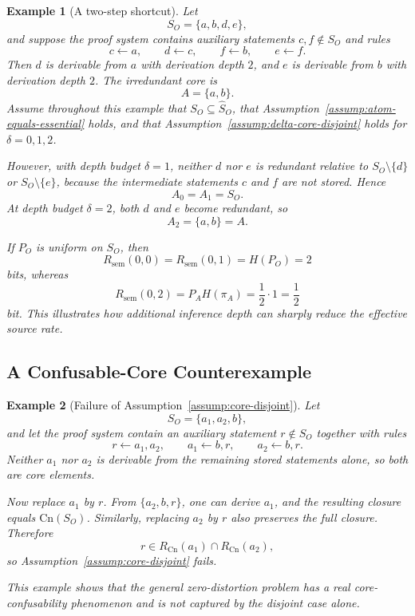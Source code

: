 \documentclass[journal,onecolumn]{IEEEtran}
\newcommand{\Cn}{\text{Cn}}
\newtheorem{example}{Example}[section]
\numberwithin{equation}{section}
\begin{document}
\begin{example}[A two-step shortcut]
\label{ex:rate-depth}
Let
\[
  S_O=\{a,b,d,e\},
\]
and suppose the proof system contains auxiliary statements
\(c,f\notin S_O\) and rules
\[
  c\leftarrow a,
  \qquad
  d\leftarrow c,
  \qquad
  f\leftarrow b,
  \qquad
  e\leftarrow f.
\]
Then \(d\) is derivable from \(a\) with derivation depth \(2\), and \(e\)
is derivable from \(b\) with derivation depth \(2\).
The irredundant core is
\[
  A=\{a,b\}.
\]
Assume throughout this example that \(S_O\subseteq\hat S_O\), that
Assumption~\ref{assump:atom-equals-essential} holds, and that
Assumption~\ref{assump:delta-core-disjoint} holds for
\(\delta=0,1,2\).

However, with depth budget \(\delta=1\), neither \(d\) nor \(e\)
is redundant relative to \(S_O\setminus\{d\}\) or \(S_O\setminus\{e\}\),
because the intermediate statements \(c\) and \(f\) are not stored.
Hence
\[
  A_0=A_1=S_O.
\]
At depth budget \(\delta=2\), both \(d\) and \(e\) become redundant,
so
\[
  A_2=\{a,b\}=A.
\]

If \(P_O\) is uniform on \(S_O\), then
\[
  R_{\mathrm{sem}}(0,0)=R_{\mathrm{sem}}(0,1)=H(P_O)=2
\]
bits, whereas
\[
  R_{\mathrm{sem}}(0,2)
  =
  P_AH(\pi_A)
  =
  \frac{1}{2}\cdot 1
  =
  \frac{1}{2}
\]
bit.
This illustrates how additional inference depth can sharply reduce the
effective source rate.
\end{example}

\subsection{A Confusable-Core Counterexample}
\label{app:counterexample-confusable}

\begin{example}[Failure of Assumption~\ref{assump:core-disjoint}]
\label{ex:confusable-core}
Let
\[
  S_O=\{a_1,a_2,b\},
\]
and let the proof system contain an auxiliary statement \(r\notin S_O\)
together with rules
\[
  r\leftarrow a_1,a_2,
  \qquad
  a_1\leftarrow b,r,
  \qquad
  a_2\leftarrow b,r.
\]
Neither \(a_1\) nor \(a_2\) is derivable from the remaining stored
statements alone, so both are core elements.

Now replace \(a_1\) by \(r\).
From \(\{a_2,b,r\}\), one can derive \(a_1\), and the resulting
closure equals \(\Cn(S_O)\).
Similarly, replacing \(a_2\) by \(r\) also preserves the full closure.
Therefore
\[
  r\in R_{\Cn}(a_1)\cap R_{\Cn}(a_2),
\]
so Assumption~\ref{assump:core-disjoint} fails.

This example shows that the general zero-distortion problem has a real
core-confusability phenomenon and is not captured by the disjoint case
alone.
\end{example}
\end{document}

